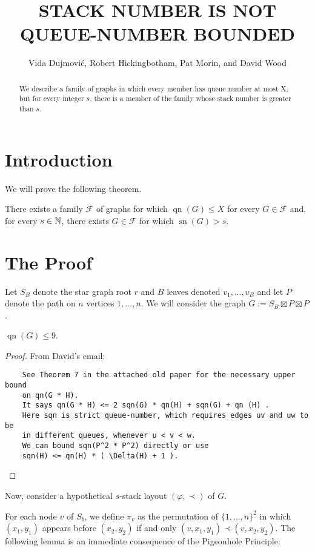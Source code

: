\documentclass[kpfonts]{patmorin}
\title{\MakeUppercase{Stack Number is not Queue-Number Bounded}}
\author{Vida Dujmović, Robert Hickingbotham, Pat Morin, and David Wood}
\DeclareMathOperator{\sn}{sn}
\DeclareMathOperator{\qn}{qn}
\begin{document}
\maketitle

\begin{abstract}
  We describe a family of graphs in which every member has queue number at most X, but for every integer $s$, there is a member of the family whose stack number is greater than $s$.
\end{abstract}

\section{Introduction}

We will prove the following theorem.

\begin{thm}
  There exists a family $\mathcal{F}$ of graphs for which $\qn(G)\le X$ for every $G\in\mathcal{F}$ and, for every $s\in\mathbb{N}$, there exists $G\in\mathcal{F}$ for which $\sn(G)>s$.
\end{thm}

\section{The Proof}

Let $S_B$ denote the star graph root $r$ and $B$ leaves denoted $v_1,\ldots,v_B$ and let $P$ denote the path on $n$ vertices $1,\ldots,n$.  We will consider the graph $G:=S_B\boxtimes P\boxtimes P$.

\begin{lem}
    $\qn(G) \le 9$.
\end{lem}

\begin{proof}
From David's email:
\begin{verbatim}
    See Theorem 7 in the attached old paper for the necessary upper bound
    on qn(G * H).
    It says qn(G * H) <= 2 sqn(G) * qn(H) + sqn(G) + qn (H) .
    Here sqn is strict queue-number, which requires edges uv and uw to be
    in different queues, whenever u < v < w.
    We can bound sqn(P^2 * P^2) directly or use
    sqn(H) <= qn(H) * ( \Delta(H) + 1 ).
\end{verbatim}
\end{proof}

Now, consider a hypothetical $s$-stack layout $(\varphi,\prec)$ of $G$.

For each node $v$ of $S_b$, we define $\pi_v$ as the permutation of $\{1,\ldots,n\}^2$ in which $(x_1,y_1)$ appears before $(x_2,y_2)$ if and only $(v,x_1,y_1)\prec (v,x_2,y_2)$.  The following lemma is an immediate consequence of the Pigeonhole Principle:
\end{document}
